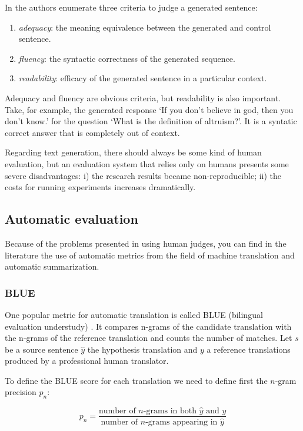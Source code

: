 In \cite{Stent} the authors enumerate three criteria to judge a generated sentence:

\begin{enumerate}
\item \textit{adequacy}: the meaning equivalence between the generated and control sentence. 
\item \textit{fluency}: the syntactic correctness of the generated sequence.
\item \textit{readability}: efficacy of the generated sentence in a particular context.
\end{enumerate}

Adequacy and fluency are obvious criteria, but readability is also important. Take, for example, the generated response `If you don’t believe in god, then you don’t know.' for the question `What is the definition of altruism?'. It is a syntatic correct answer that is completely out of context.

Regarding text generation, there should always be some kind of human evaluation, but an evaluation system that relies only on humans presents some severe disadvantages: i) the research results became non-reproducible; ii) the costs for running experiments increases dramatically.

\subsection{Automatic evaluation}


Because of the problems presented in using human judges, you can find in the literature the use of automatic metrics from the field of machine translation and automatic summarization.

\subsubsection{BLUE}

One popular metric for automatic translation is called BLUE (bilingual evaluation understudy) \cite{Papineni2001}. It compares n-grams of the candidate translation with the n-grams of the reference translation and counts the number of matches. Let $s$ be a source sentence $\hat{y}$ the hypothesis translation and $y$ a reference translations produced by a professional human translator. 

To define the BLUE score for each translation we need to define first the $n$-gram precision $p_n$:

\begin{equation}
p_n = \frac{\text{number of } n\text{-grams in both } \hat{y} \text{ and } y}{\text{number of } n\text{-grams appearing in } \hat{y}}
\end{equation}    

